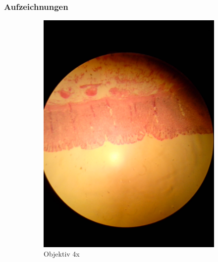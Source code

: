 \subsubsection{Aufzeichnungen}
\begin{figure}[h!]
	\centering
	\begin{subfigure}[b]{0.3\textwidth}
		\includegraphics[width=1\textwidth]{../images/01_stomach.jpg}
		\caption{Objektiv 4x}
		\label{fig:01_stomach}
	\end{subfigure}
	\begin{subfigure}[b]{0.3\textwidth}

\end{subfigure}
\end{figure}
